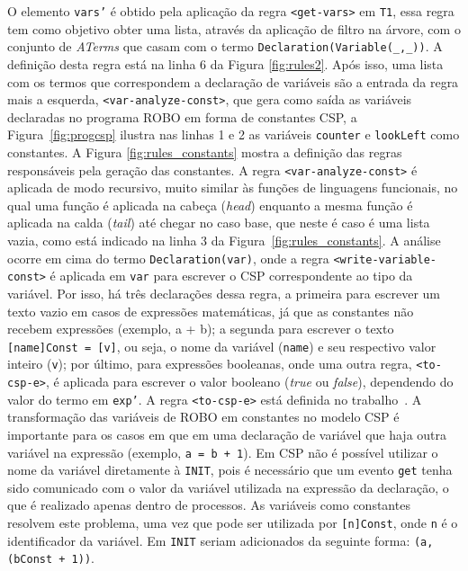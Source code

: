 O elemento \texttt{vars'} é obtido pela aplicação da regra \texttt{<get-vars>} em \texttt{T1}, essa regra tem como objetivo obter uma lista, através da aplicação de filtro na árvore, com o conjunto de \textit{ATerms} que casam com o termo \texttt{Declaration(Variable(\_,\_))}. A definição desta regra está na linha 6 da Figura \ref{fig:rules2}. Após isso, uma lista com os termos que correspondem a declaração de variáveis são a entrada da regra mais a esquerda, \texttt{<var-analyze-const>}, que gera como saída  as variáveis declaradas no programa ROBO em forma de constantes CSP, a Figura~\ref{fig:progcsp} ilustra nas linhas 1 e 2 as variáveis \texttt{counter} e \texttt{lookLeft} como constantes. A Figura \ref{fig:rules_constants} mostra a definição das regras responsáveis pela geração das constantes. A regra \texttt{<var-analyze-const>} é aplicada de modo recursivo, muito similar às funções de linguagens funcionais, no qual uma função é aplicada na cabeça (\textit{head}) enquanto a mesma função é aplicada na calda (\textit{tail}) até chegar no caso base, que neste é caso é uma lista vazia, como está indicado na linha 3 da Figura~\ref{fig:rules_constants}. A análise ocorre em cima do termo \texttt{Declaration(var)}, onde a regra \texttt{<write-variable-const>} é aplicada em \texttt{var} para escrever o CSP correspondente ao tipo da variável. Por isso, há três declarações dessa regra, a primeira para escrever um texto vazio em casos de expressões matemáticas, já que as constantes não recebem expressões (exemplo, a + b); a segunda para escrever o texto \texttt{[name]Const = [v]}, ou seja, o nome da variável (\texttt{name}) e seu respectivo valor inteiro (\texttt{v}); por último, para expressões booleanas, onde uma outra regra, \texttt{<to-csp-e>}, é aplicada para escrever o valor booleano (\textit{true} ou \textit{false}), dependendo do valor do termo em \texttt{exp'}. A regra \texttt{<to-csp-e>} está definida no trabalho~\cite{nogueira}. A transformação das variáveis de ROBO em constantes no modelo CSP é importante para os casos em que em uma declaração de variável que haja outra variável na expressão (exemplo, \texttt{a = b + 1}). Em CSP não é possível utilizar o nome da variável diretamente à \texttt{INIT}, pois é necessário que um evento \texttt{get} tenha sido comunicado com o valor da variável utilizada na expressão da declaração, o que é realizado apenas dentro de processos. As variáveis como constantes resolvem este problema, uma vez que pode ser utilizada por \texttt{[n]Const}, onde \texttt{n} é o identificador da variável. Em \texttt{INIT} seriam adicionados da seguinte forma: \texttt{(a, (bConst + 1))}.

